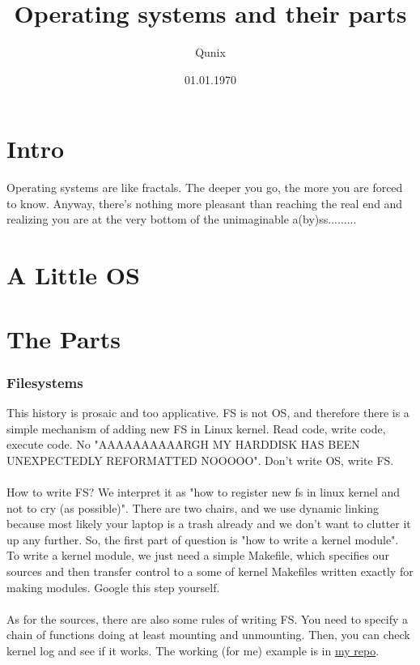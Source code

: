 \documentclass[14pt]{extarticle}
\title{Operating systems and their parts}
\author{Qunix}
\date{01.01.1970}
\begin{document}
\maketitle
\tableofcontents

\part{Intro}
Operating systems are like fractals. The deeper you go, the more you 
are forced to know. Anyway, there's nothing more pleasant than reaching 
the real end and realizing you are at the very bottom of the unimaginable a(by)ss.........

\part{A Little OS}

\part{The Parts}
\section{Filesystems}
This history is prosaic and too applicative. FS is not OS, and therefore
there is a simple mechanism of adding new FS in Linux kernel. 
Read code, write code, execute code. No "AAAAAAAAAARGH MY HARDDISK HAS 
BEEN UNEXPECTEDLY REFORMATTED NOOOOO". Don't write OS, write FS. 
\\\\
How to write FS? We interpret it as "how to register new fs in linux kernel
and not to cry (as possible)". There are two chairs, and we use dynamic 
linking because most likely your laptop is a trash already and we don't 
want to clutter it up any further. So, the first part of question is 
"how to write a kernel module".   
\\
To write a kernel module, we just need a simple Makefile, which 
specifies our sources and then transfer control to a some of kernel 
Makefiles written exactly for making modules. Google this step yourself.
\\\\
As for the sources, there are also some rules of writing FS. You need 
to specify a chain of functions doing at least mounting and unmounting.
Then, you can check kernel log and see if it works. The working (for me)
example is in \href{https://github.com/x6x4/custom_fs}{my repo}.
\end{document}
